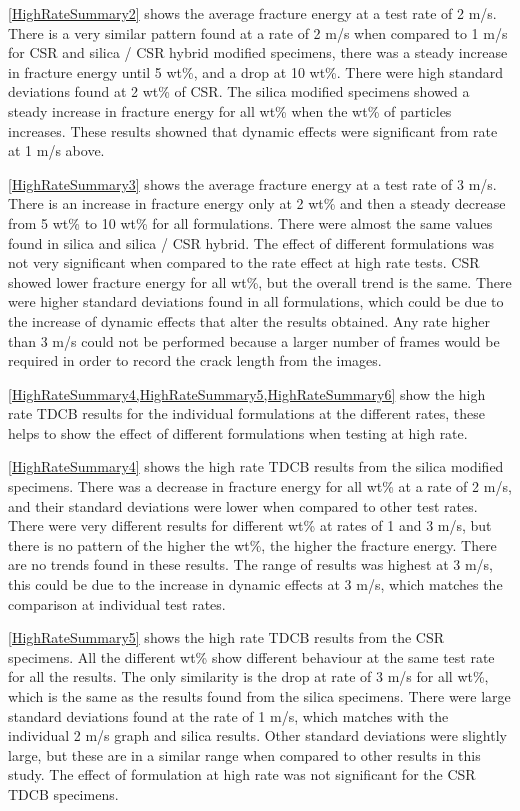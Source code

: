 \documentclass[numbers=noendperiod,chapterprefix=on]{icldt} %
\begin{document}
\ref{HighRateSummary2} shows the average fracture energy at a  test rate of 2 m/s. There is a very similar pattern found at a  rate of 2 m/s when compared to 1 m/s for CSR and silica / CSR hybrid modified specimens, there was a steady increase in fracture energy until 5 wt\%, and a drop at 10 wt\%. There were high standard deviations found at 2 wt\% of CSR. The silica modified specimens showed a steady increase in fracture energy for all wt\% when the wt\% of particles increases. These results showned that dynamic effects were significant from rate at 1 m/s above. 

\ref{HighRateSummary3} shows the average fracture energy at a  test rate of 3 m/s. There is an increase in fracture energy only at 2 wt\% and then a steady decrease from 5 wt\% to 10 wt\% for all formulations. There were almost the same values found in silica and silica / CSR hybrid. The effect of different formulations was not very significant when compared to the rate effect at high rate tests. CSR showed lower fracture energy for all wt\%, but the overall trend is the same. There were higher standard deviations found in all formulations, which could be due to the increase of dynamic effects that alter the results obtained. Any rate higher than 3 m/s could not be performed because a larger number of frames would be required in order to record the crack length from the images.   

\ref{HighRateSummary4,HighRateSummary5,HighRateSummary6} show the high rate TDCB results for the individual formulations at the different rates, these helps to show the effect of different formulations when testing at high rate.

\ref{HighRateSummary4} shows the high rate TDCB results from the silica modified specimens. There was a decrease in fracture energy for all wt\% at a rate of 2 m/s, and their standard deviations were lower when compared to other test rates. There were very different results  for different wt\% at rates of 1 and 3 m/s, but there is no pattern of the higher the wt\%, the higher the fracture energy. There are no trends found in these results. The range of results was highest at 3 m/s, this could be due to the increase in dynamic effects at 3 m/s, which matches the comparison at individual test rates.

\ref{HighRateSummary5} shows the high rate TDCB results from the CSR specimens. All the different wt\% show different behaviour at the same test rate for all the results. The only similarity is the drop at rate of 3 m/s for all wt\%, which is the same as the results found from the silica specimens. There were large standard deviations found at the rate of 1 m/s, which matches with the individual 2 m/s graph and silica results. Other standard deviations were slightly large, but these are in a similar range when compared to other results in this study. The effect of formulation at high rate was not significant for the CSR TDCB specimens.
\end{document}
